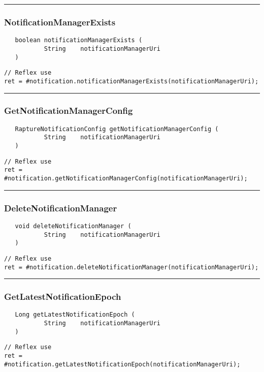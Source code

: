 \rule{15cm}{2pt}
\subsubsection{NotificationManagerExists}
\label{Api:NotificationManagerExists}
\begin{verbatim}
   boolean notificationManagerExists (
           String    notificationManagerUri
   )
\end{verbatim}
\begin{lstlisting}[language=reflex]
// Reflex use
ret = #notification.notificationManagerExists(notificationManagerUri);
\end{lstlisting}



\rule{15cm}{2pt}
\subsubsection{GetNotificationManagerConfig}
\label{Api:GetNotificationManagerConfig}
\begin{verbatim}
   RaptureNotificationConfig getNotificationManagerConfig (
           String    notificationManagerUri
   )
\end{verbatim}
\begin{lstlisting}[language=reflex]
// Reflex use
ret = #notification.getNotificationManagerConfig(notificationManagerUri);
\end{lstlisting}



\rule{15cm}{2pt}
\subsubsection{DeleteNotificationManager}
\label{Api:DeleteNotificationManager}
\begin{verbatim}
   void deleteNotificationManager (
           String    notificationManagerUri
   )
\end{verbatim}
\begin{lstlisting}[language=reflex]
// Reflex use
ret = #notification.deleteNotificationManager(notificationManagerUri);
\end{lstlisting}



\rule{15cm}{2pt}
\subsubsection{GetLatestNotificationEpoch}
\label{Api:GetLatestNotificationEpoch}
\begin{verbatim}
   Long getLatestNotificationEpoch (
           String    notificationManagerUri
   )
\end{verbatim}
\begin{lstlisting}[language=reflex]
// Reflex use
ret = #notification.getLatestNotificationEpoch(notificationManagerUri);
\end{lstlisting}



